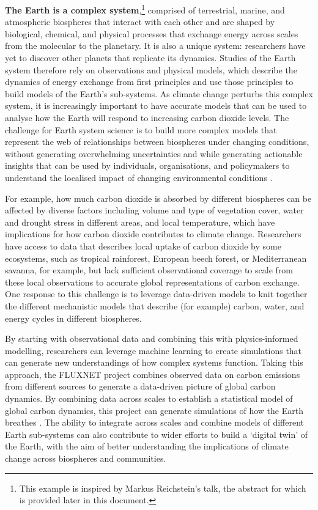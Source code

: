 \textbf{The Earth is a complex system},\footnote{This example is
  inspired by Markus Reichstein's talk, the abstract for which is
  provided later in this document.} comprised of terrestrial, marine,
and atmospheric biospheres that interact with each other and are shaped
by biological, chemical, and physical processes that exchange energy
across scales from the molecular to the planetary. It is also a unique
system: researchers have yet to discover other planets that replicate
its dynamics. Studies of the Earth system therefore rely on observations
and physical models, which describe the dynamics of energy exchange from
first principles and use those principles to build models of the Earth's
sub-systems. As climate change perturbs this complex system, it is
increasingly important to have accurate models that can be used to
analyse how the Earth will respond to increasing carbon dioxide levels.
The challenge for Earth system science is to build more complex models
that represent the web of relationships between biospheres under
changing conditions, without generating overwhelming uncertainties and
while generating actionable insights that can be used by individuals,
organisations, and policymakers to understand the localised impact of
changing environmental conditions \citep{Summers-localized22}.

For example, how much carbon dioxide is absorbed by different biospheres
can be affected by diverse factors including volume and type of
vegetation cover, water and drought stress in different areas, and local
temperature, which have implications for how carbon dioxide contributes
to climate change. Researchers have access to data that describes local
uptake of carbon dioxide by some ecosystems, such as tropical
rainforest, European beech forest, or Mediterranean savanna, for
example, but lack sufficient observational coverage to scale from these
local observations to accurate global representations of carbon
exchange. One response to this challenge is to leverage data-driven
models to knit together the different mechanistic models that describe
(for example) carbon, water, and energy cycles in different biospheres.

By starting with observational data and combining this with
physics-informed modelling, researchers can leverage machine learning to
create simulations that can generate new understandings of how complex
systems function. Taking this approach, the FLUXNET project combines
observed data on carbon emissions from different sources to generate a
data-driven picture of global carbon dynamics. By combining data across
scales to establish a statistical model of global carbon dynamics, this
project can generate simulations of how the Earth breathes \citep{Beer-terrestrial10}. The ability to integrate across scales and
combine models of different Earth sub-systems can also contribute to
wider efforts to build a `digital twin' of the Earth, with the aim of
better understanding the implications of climate change across
biospheres and communities.


